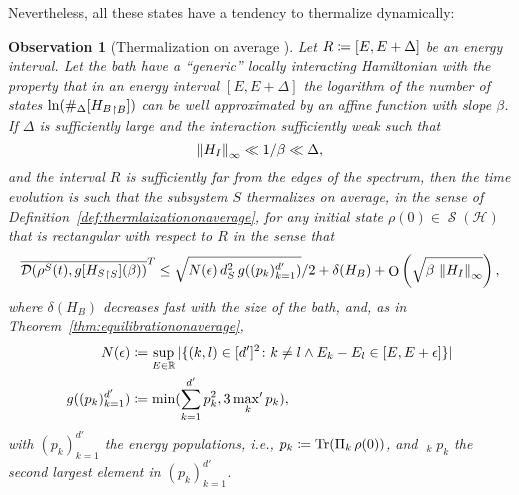 \documentclass[a4paper,12pt,listof=totoc,index=totoc,bibliography=totoc,headsepline=false,headings=normal,BCOR16.153846mm,DIV12,headinclude,twoside,cleardoublepage=empty,numbers=noenddot,final]{scrreprt}
\theoremstyle{mystyle}
\numberwithin{equation}{section}
\numberwithin{figure}{section}
\numberwithin{lemma}{section}
\numberwithin{theorem}{section}
\numberwithin{corollary}{section}
\numberwithin{definition}{section}
\numberwithin{conjecture}{section}
\newtheorem{observation}{Observation}
\numberwithin{observation}{section}
\newcommand{\+}{\mkern2mu}
\newcommand{\coloneqq}{\mathrel{\vcentcolon\mkern-1.2mu=}} %
\newcommand{\suchthat}{\colon}
\renewcommand{\min}{\mathchoice{\operatorname*{min}}{\operatorname*{min}}{\mathrm{min}}{\mathrm{min}}}
\renewcommand{\H}{H}
\newcommand{\rhog}{g}
\newcommand{\norm}[2][]{
  \ifthenelse{\equal{#1}{}}
    {\left\| {#2} \right\|}
    {\ifthenelse{\equal{#1}{uinv}}
      {\left\vert\kern-0.25ex\left\vert\kern-0.25ex\left\vert {#2} \right\vert\kern-0.25ex\right\vert\kern-0.25ex\right\vert}
      {\left\| {#2} \right\|_{#1}}
    }
}
\newcommand{\taverage}[2][]{
  \ifthenelse{\equal{#1}{}}
  {\overline{#2}}
  {\overline{#2}^{#1}}
}
\newcommand{\tracedistance}[3][]{
  \ifthenelse{\equal{#2}{}}
  {\ifthenelse{\equal{#3}{}}
    {\mathcal{D}_{#1}}{}
  }{
    \ifthenelse{\equal{#1}{}}
    {\operatorname{\mathcal{D}}(#2,#3)}
    {\operatorname{\mathcal{D}}_{#1}(#2,#3)}
  }
}
\DeclareMathOperator{\landauO}{O}
\DeclareMathOperator*{\maxprime}{\mathrm{max}^\prime}
\newcommand{\trunc}[2]{{#1}_{\upharpoonright \mathnormal{#2}}}
\DeclareMathOperator{\1}{\mathds{1}}
\DeclareMathOperator{\Qst}{\mathcal{S}}
\DeclareMathOperator{\Tr}{Tr}
\newcommand{\mc}[1]{\mathcal{#1}}
\newcommand{\mcH}{\mc{H}}
\newcommand{\mb}[1]{\mathbb{#1}}
\newcommand{\R}{\mb{R}}
\begin{document}
Nevertheless, all these states have a tendency to thermalize dynamically:
\begin{observation}[Thermalization on average \cite{Riera2012}] \label{obs:thermalizationonaverage}
  Let $R \coloneqq [E,E+\Delta]$ be an energy interval.
  Let the bath have a ``generic'' locally interacting Hamiltonian with the property that in an energy interval $[E,E+\Delta]$ the logarithm of the number of states $\ln(\#_\Delta[\trunc{\H_B}B])$ can be well approximated by an affine function with slope $\beta$.
  If $\Delta$ is sufficiently large and the interaction sufficiently weak such that
  \begin{equation}
    \norm[\infty]{\H_I} \ll 1/\beta \ll \Delta ,
  \end{equation}
  and the interval $R$ is sufficiently far from the edges of the spectrum, then the time evolution is such that the subsystem $S$ thermalizes on average, in the sense of Definition~\ref{def:thermlaizationonaverage}, for any initial state $\rho(0) \in \Qst(\mcH)$ that is rectangular with respect to $R$ in the sense that
  \begin{equation} 
    \taverage[T]{\tracedistance{\rho^S(t)}{\rhog[\trunc{\H_S}S](\beta)}} \leq \sqrt{N(\epsilon)\,d_S^2\,g((p_k)_{k=1}^{d'}) }/2 + \delta(\H_B) + \landauO\left(\sqrt{\beta\,\norm[\infty]{H_I}}\right) ,
  \end{equation}
  where $\delta(\H_B)$ decreases fast with the size of the bath, and, as in Theorem~\ref{thm:equilibrationonaverage},
  \begin{align}
    N(\epsilon) &\coloneqq \sup_{E \in \R} |\{(k,l) \in [d']^2\suchthat k\neq l \land E_k - E_l \in [E,E+\epsilon] \}| \\
    g((p_k)_{k=1}^{d'}) &\coloneqq \min(\sum_{k=1}^{d'} p_k^2, 3  \maxprime_k p_k ) ,
  \end{align}
  with $(p_k)_{k=1}^{d'}$ the energy populations, i.e., $p_k \coloneqq \Tr(\Pi_k\,\rho(0))$, and $\maxprime_k p_k$ the second largest element in $(p_k)_{k=1}^{d'}$.
\end{observation}
\end{document}
